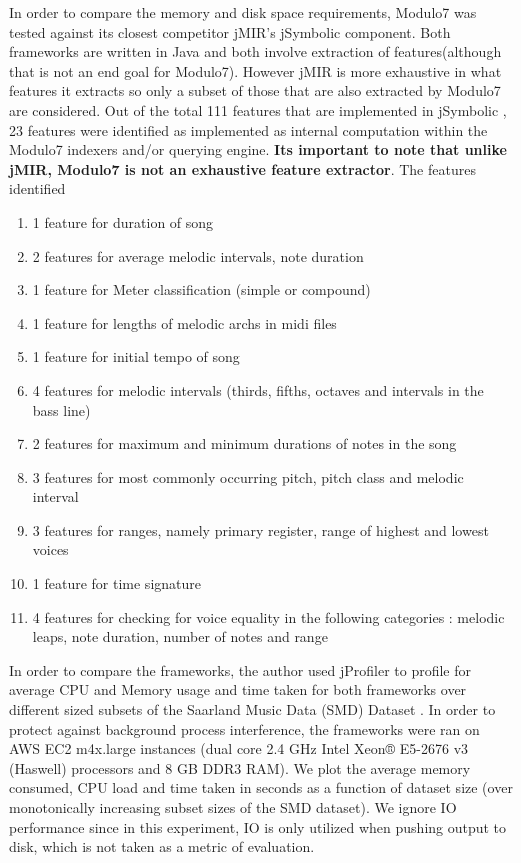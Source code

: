 \noindent In order to compare the memory and disk space requirements, Modulo7 was tested against its closest competitor jMIR's \cite{jMIR} jSymbolic component. Both frameworks are written in Java and both involve extraction of features(although that is not an end goal for Modulo7). However jMIR is more exhaustive in what features it extracts so only a subset of those that are also extracted by Modulo7 are considered. Out of the total 111 features that are implemented in jSymbolic \cite{jSymbolic}, 23 features were identified as implemented as internal computation within the Modulo7 indexers and/or querying engine. \textbf{Its important to note that unlike jMIR, Modulo7 is not an exhaustive feature extractor}. The features identified  
\begin{enumerate}
\item 1 feature for duration of song
\item 2 features for average melodic intervals, note duration
\item 1 feature for Meter classification (simple or compound)
\item 1 feature for lengths of melodic archs in midi files
\item 1 feature for initial tempo of song
\item 4 features for melodic intervals (thirds, fifths, octaves and intervals in the bass line)
\item 2 features for maximum and minimum durations of notes in the song
\item 3 features for most commonly occurring pitch, pitch class and melodic interval
\item 3 features for ranges, namely primary register, range of highest and lowest voices
\item 1 feature for time signature
\item 4 features for checking for voice equality in the following categories : melodic leaps, note duration, number of notes and range
\end{enumerate}
\noindent In order to compare the frameworks, the author used jProfiler to profile for average CPU and Memory usage and time taken for both frameworks over different sized subsets of the Saarland Music Data (SMD) Dataset \cite{saarlandmsd}. In order to protect against background process interference, the frameworks were ran on AWS EC2 m4x.large instances (dual core 2.4 GHz Intel Xeon® E5-2676 v3 (Haswell) processors
and 8 GB DDR3 RAM). We plot the average memory consumed, CPU load and time taken in seconds as a function of dataset size (over monotonically increasing subset sizes of the SMD dataset). We ignore IO performance since in this experiment, IO is only utilized when pushing output to disk, which is not taken as a metric of evaluation. 
